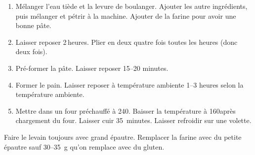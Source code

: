 
\begin{ingredients}
\end{ingredients}


\begin{recipe}
  \begin{enumerate}

  \item Mélanger l'eau tiède et la levure de boulanger.  Ajouter les
    autre ingrédients, puis mélanger et pétrir à la machine.  Ajouter
    de la farine pour avoir une bonne pâte.
    
  \item Laisser reposer 2$\,$\fracH heures.  Plier en deux quatre fois toutes
    les heures (donc deux fois).
    
  \item Pré-former la pâte.  Laisser reposer 15--20 minutes.
    
  \item Former le pain.  Laisser reposer à température ambiente 1--3
    heures selon la température ambiente.
    
  \item Mettre dans un four préchauffé à 240\C.  Baisser la
    température à 160\C après chargement du four.  Laisser cuir
    35~minutes.  Laisser refroidir sur une volette.

  \end{enumerate}
\end{recipe}


Faire le levain toujours avec grand épautre.
Remplacer la farine avec du petite épautre sauf 30--35~g qu'on
remplace avec du gluten.

